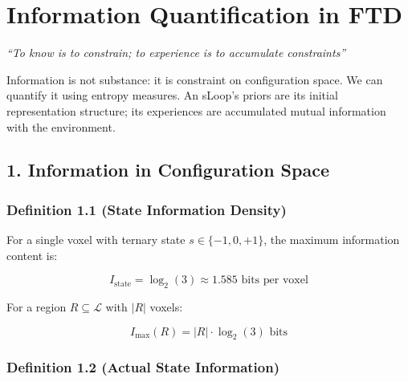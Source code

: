 \documentclass[
  11pt,
  letterpaper,
  twoside,
  openany]{book}
\makeatletter
\let\orig@section\section
\renewcommand{\section}{\needspace{8\baselineskip}\orig@section}
\let\orig@subsection\subsection
\renewcommand{\subsection}{\needspace{6\baselineskip}\orig@subsection}
\makeatother
\begin{document}
\chapter{Information Quantification in
FTD}\label{sec-information-quantification}

\emph{``To know is to constrain; to experience is to accumulate
constraints''}

\begin{tcolorbox}[enhanced jigsaw, colbacktitle=quarto-callout-note-color!10!white, titlerule=0mm, bottomtitle=1mm, bottomrule=.15mm, colback=white, arc=.35mm, breakable, toprule=.15mm, title=\textcolor{quarto-callout-note-color}{\faInfo}\hspace{0.5em}{Key Revelation}, rightrule=.15mm, coltitle=black, leftrule=.75mm, colframe=quarto-callout-note-color-frame, toptitle=1mm, opacityback=0, opacitybacktitle=0.6, left=2mm]

Information is not substance: it is constraint on configuration space.
We can quantify it using entropy measures. An sLoop's priors are its
initial representation structure; its experiences are accumulated mutual
information with the environment.

\end{tcolorbox}

\section{1. Information in Configuration
Space}\label{information-in-configuration-space}

\subsection{Definition 1.1 (State Information
Density)}\label{definition-1.1-state-information-density}

For a single voxel with ternary state \(s \in \{-1, 0, +1\}\), the
maximum information content is:

\[I_{\text{state}} = \log_2(3) \approx 1.585 \text{ bits per voxel}\]

For a region \(R \subseteq \mathcal{L}\) with \(|R|\) voxels:

\[I_{\text{max}}(R) = |R| \cdot \log_2(3) \text{ bits}\]

\subsection{Definition 1.2 (Actual State
Information)}\label{definition-1.2-actual-state-information}
\end{document}
